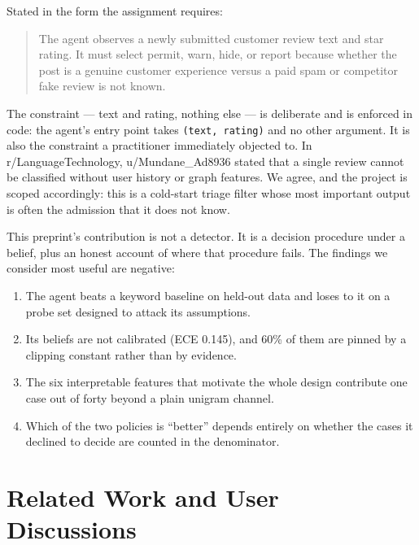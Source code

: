 \documentclass{article}
\begin{document}
Stated in the form the assignment requires:

\begin{quote}
    The agent observes a newly submitted customer review text and star rating.
    It must select permit, warn, hide, or report because whether the post is a
    genuine customer experience versus a paid spam or competitor fake review is
    not known.
\end{quote}

The constraint --- text and rating, nothing else --- is deliberate and is
enforced in code: the agent's entry point takes \texttt{(text, rating)} and no
other argument. It is also the constraint a practitioner immediately objected
to. In r/LanguageTechnology, u/Mundane\_Ad8936 stated that a single review
cannot be classified without user history or graph features. We agree, and the
project is scoped accordingly: this is a cold-start triage filter whose most
important output is often the admission that it does not know.

This preprint's contribution is not a detector. It is a decision procedure
under a belief, plus an honest account of where that procedure fails. The
findings we consider most useful are negative:

\begin{enumerate}
    \item The agent beats a keyword baseline on held-out data and loses to it
          on a probe set designed to attack its assumptions.
    \item Its beliefs are not calibrated (ECE 0.145), and 60\% of them are
          pinned by a clipping constant rather than by evidence.
    \item The six interpretable features that motivate the whole design
          contribute one case out of forty beyond a plain unigram channel.
    \item Which of the two policies is ``better'' depends entirely on whether
          the cases it declined to decide are counted in the denominator.
\end{enumerate}

\section{Related Work and User Discussions}\label{sec:related}
\end{document}
